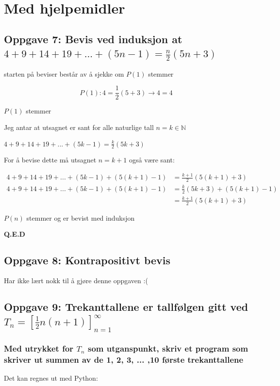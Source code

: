 \documentclass{article}
\begin{document}
\section{Med hjelpemidler}

\subsection{Oppgave 7: Bevis ved induksjon at $4+9+14+19+...+(5n-1)=\frac{n}{2}(5n+3)$}

starten på beviser består av å sjekke om $P(1)$ stemmer

$$P(1) : 4 = \frac{1}{2}(5+3) \rightarrow 4 = 4$$

$P(1)$ stemmer

Jeg antar at utsagnet er sant for alle naturlige tall $n = k \in \mathbb{N}$

$4+9+14+19+...+(5k-1)=\frac{k}{2}(5k+3)$

For å bevise dette må utsagnet $n = k + 1$ også være sant:

\begin{align*}
    4+9+14+19+...+(5k-1)+(5(k+1)-1) &= \frac{k+1}{2}(5(k+1)+3) \\
    4+9+14+19+...+(5k-1)+(5(k+1)-1) &= \frac{k}{2}(5k+3) + (5(k+1)-1) \\
    &= \frac{k+1}{2}(5(k+1)+3)
\end{align*}

$P(n)$ stemmer og er bevist med induksjon

\textbf{Q.E.D}

\subsection{Oppgave 8: Kontrapositivt bevis}

Har ikke lært nokk til å gjøre denne oppgaven :(

\subsection{Oppgave 9: Trekanttallene er tallfølgen gitt ved $T_n = [\frac{1}{2} n(n+1)]^{\infty}_{n=1}$}

\subsubsection{Med utrykket for $T_n$ som utganspunkt, skriv et program som skriver ut summen av de 1, 2, 3, ... ,10 første trekanttallene}

Det kan regnes ut med Python:
\end{document}
